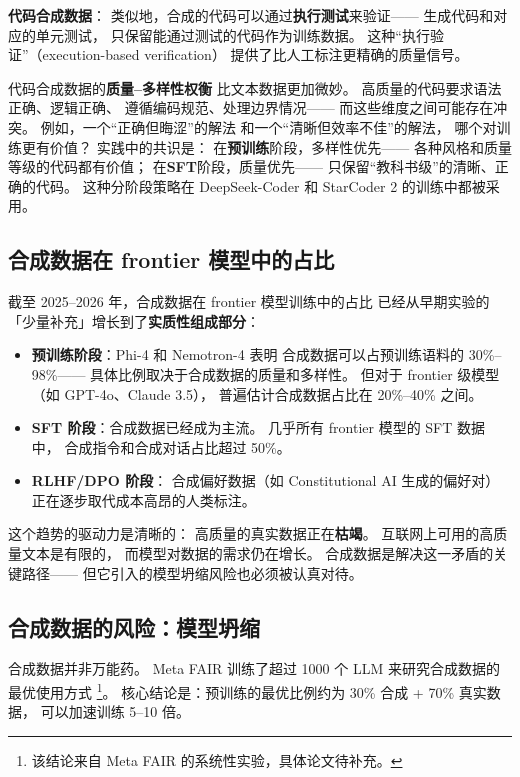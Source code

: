 \textbf{代码合成数据}：
类似地，合成的代码可以通过\textbf{执行测试}来验证——
生成代码和对应的单元测试，
只保留能通过测试的代码作为训练数据。
这种``执行验证''（execution-based verification）
提供了比人工标注更精确的质量信号。

代码合成数据的\textbf{质量--多样性权衡}
比文本数据更加微妙。
高质量的代码要求语法正确、逻辑正确、
遵循编码规范、处理边界情况——
而这些维度之间可能存在冲突。
例如，一个``正确但晦涩''的解法
和一个``清晰但效率不佳''的解法，
哪个对训练更有价值？
实践中的共识是：
在\textbf{预训练}阶段，多样性优先——
各种风格和质量等级的代码都有价值；
在\textbf{SFT}阶段，质量优先——
只保留``教科书级''的清晰、正确的代码。
这种分阶段策略在 DeepSeek-Coder 和 StarCoder 2
的训练中都被采用。

\subsection{合成数据在 frontier 模型中的占比}

截至 2025--2026 年，合成数据在 frontier 模型训练中的占比
已经从早期实验的「少量补充」增长到了\textbf{实质性组成部分}：

\begin{itemize}[noitemsep]
  \item \textbf{预训练阶段}：Phi-4 和 Nemotron-4 表明
        合成数据可以占预训练语料的 30\%--98\%——
        具体比例取决于合成数据的质量和多样性。
        但对于 frontier 级模型（如 GPT-4o、Claude 3.5），
        普遍估计合成数据占比在 20\%--40\% 之间。
  \item \textbf{SFT 阶段}：合成数据已经成为主流。
        几乎所有 frontier 模型的 SFT 数据中，
        合成指令和合成对话占比超过 50\%。
  \item \textbf{RLHF/DPO 阶段}：
        合成偏好数据（如 Constitutional AI 生成的偏好对）
        正在逐步取代成本高昂的人类标注。
\end{itemize}

这个趋势的驱动力是清晰的：
高质量的真实数据正在\textbf{枯竭}。
互联网上可用的高质量文本是有限的，
而模型对数据的需求仍在增长。
合成数据是解决这一矛盾的关键路径——
但它引入的模型坍缩风险也必须被认真对待。

\subsection{合成数据的风险：模型坍缩}

合成数据并非万能药。
Meta FAIR 训练了超过 1000 个 LLM
来研究合成数据的最优使用方式%
\footnote{该结论来自 Meta FAIR 的系统性实验，具体论文待补充。}。
核心结论是：预训练的最优比例约为 30\% 合成 + 70\% 真实数据，
可以加速训练 5--10 倍。

